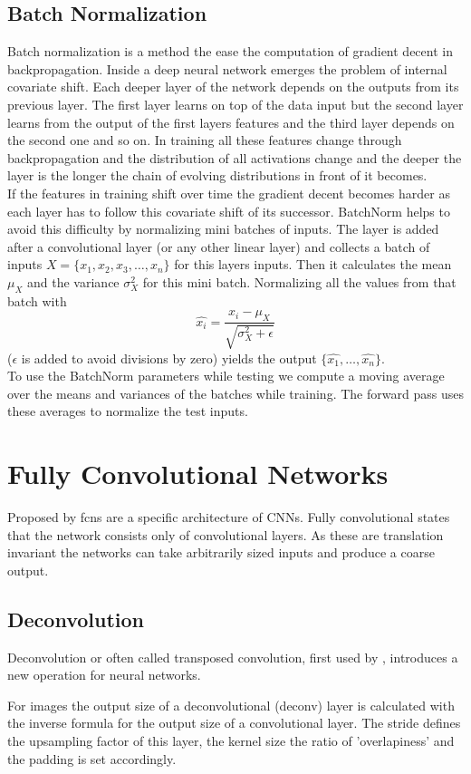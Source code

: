 \subsection{Batch Normalization} %
\label{sub:conepts:nn:batchnorm}
Batch normalization \citep{ioffe_batch_2015} is a method the ease the computation of gradient decent in backpropagation. Inside a deep neural network emerges the problem of internal covariate shift. Each deeper layer of the network depends on the outputs from its previous layer. The first layer learns on top of the data input but the second layer learns from the output of the first layers features and the third layer depends on the second one and so on. In training all these features change through backpropagation and the distribution of all activations change and the deeper the layer is the longer the chain of evolving distributions in front of it becomes.\\
If the features in training shift over time the gradient decent becomes harder as each layer has to follow this covariate shift of its successor. BatchNorm helps to avoid this difficulty by normalizing mini batches of inputs. The layer is added after a convolutional layer (or any other linear layer) and collects a batch of inputs $X = \{x_1, x_2, x_3, \dots, x_n\}$ for this layers inputs. Then it calculates the mean $\mu_X$ and the variance $\sigma_X^2$ for this mini batch. Normalizing all the values from that batch  with
\begin{equation}
    \hat{x_i} = \frac{x_i - \mu_X}{\sqrt{\sigma_X^2 + \epsilon}}
\end{equation}
($\epsilon$ is added to avoid divisions by zero) yields the output $\{\hat{x_1},\dots,\hat{x_n}\}$.\\
To use the BatchNorm parameters while testing we compute a moving average over the means and variances of the batches while training. The forward pass uses these averages to normalize the test inputs.

\section{Fully Convolutional Networks}
\label{sec:concepts:fcn}
Proposed by \citet{long_fully_2015} \glspl{fcn} are a specific architecture of CNNs. Fully convolutional states that the network consists only of convolutional layers. As these are translation invariant the networks can take arbitrarily sized inputs and produce a coarse output.

\subsection{Deconvolution} %
\label{sub:conepts:fcn:deconv}
Deconvolution or often called transposed convolution, first used by \citet{zeiler_deconvolutional_2010}, introduces a new operation for neural networks.

For images the output size of a deconvolutional (deconv) layer is calculated with the inverse formula for the output size of a convolutional layer. The stride defines the upsampling factor of this layer, the kernel size the ratio of 'overlapiness' and the padding is set accordingly.

